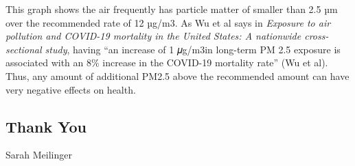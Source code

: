 \documentclass[]{article}
\begin{document}
This graph shows the air frequently has particle matter of smaller than
2.5 µm over the recommended rate of 12 µg/m3. As Wu et al says in
\emph{Exposure to air pollution and COVID-19 mortality in the United
States: A nationwide cross-sectional study}, having ``an increase of 1
𝜇g/m3in long-term PM 2.5 exposure is associated with an 8\% increase in
the COVID-19 mortality rate'' (Wu et al). Thus, any amount of additional
PM2.5 above the recommended amount can have very negative effects on
health.

\hypertarget{thank-you}{%
\subsection{Thank You}\label{thank-you}}

Sarah Meilinger
\end{document}
